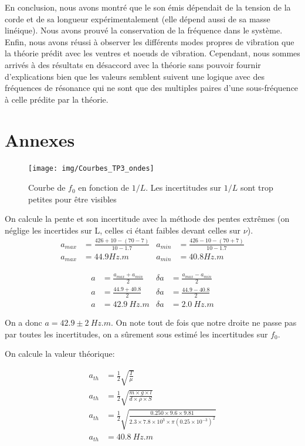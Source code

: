 \documentclass[12pt]{article}
\begin{document}
En conclusion, nous avons montré que le son émis dépendait de la tension de la corde et de sa longueur expérimentalement (elle dépend aussi de sa masse linéique). Nous avons prouvé la conservation de la fréquence dans le système.
Enfin, nous avons réussi à observer les différents modes propres de vibration que la théorie prédit avec les ventres et noeuds de vibration. Cependant, nous sommes arrivés à des résultats en désaccord avec la théorie
sans pouvoir fournir d'explications bien que les valeurs semblent suivent une logique avec des fréquences de résonance qui ne sont que des multiples paires d'une sous-fréquence à celle prédite par la théorie.

\newpage

\section*{Annexes}

\begin{figure}[h!]
    \begin{center}
        \texttt{[image: img/Courbes\_TP3\_ondes]}
        \label{img:Courbe_dernière_expérience}
        \caption{Courbe de $f_0$ en fonction de $1/L$. Les incertitudes sur $1/L$ sont trop petites pour être visibles}
    \end{center}
\end{figure}

On calcule la pente et son incertitude avec la méthode des pentes extrêmes (on néglige les incertides sur L, celles ci étant faibles devant celles sur $\nu$). 
\begin{align*}
    a_{max} &=\frac{426+10-(70-7)}{10-1.7} & a_{min} &=\frac{426-10-(70+7)}{10-1.7} \\
    a_{max} &=44.9 Hz.m & a_{min} &= 40.8 Hz.m
\end{align*}

\begin{align*}
    a&=\frac{a_{max} + a_{min}}{2} &\delta a &= \frac{a_{max} - a_{min}}{2} \\
    a&=\frac{44.9 + 40.8}{2} &\delta a &= \frac{44.9 - 40.8}{2} \\
    a&= 42.9 \ Hz.m &\delta a &= 2.0 \ Hz.m
\end{align*}

On a donc $a=42.9 \pm 2 \ Hz.m$. On note tout de fois que notre droite ne passe pas par toutes les incertitudes, on a sûrement sous estimé les incertitudes sur $f_0$.

On calcule la valeur théorique:

\begin{align*}
    a_{th} &= \frac{1}{2} \sqrt{\frac{T}{\mu}}\\
    a_{th}&=\frac{1}{2} \sqrt{\frac{m \times g \times l}{d \times \rho \times S}} \\
    a_{th}&=\frac{1}{2} \sqrt{\frac{0.250 \times 9.6 \times 9.81}{2.3 \times 7.8 \times 10^{3} \times \pi (0.25 \times 10^{-3})^2}} \\
    a_{th}&= 40.8 \ Hz.m
\end{align*}
\end{document}
